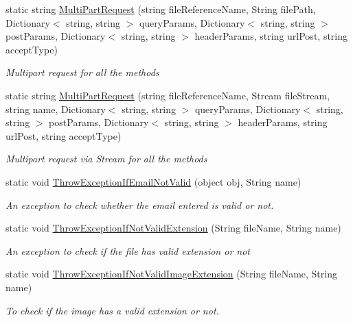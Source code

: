 \begin{DoxyCompactItemize}
\item 
static string \hyperlink{classcom_1_1shephertz_1_1app42_1_1paas_1_1sdk_1_1csharp_1_1util_1_1_util_a32655a413e38208817940c7d5b7113a1}{Multi\+Part\+Request} (string file\+Reference\+Name, String file\+Path, Dictionary$<$ string, string $>$ query\+Params, Dictionary$<$ string, string $>$ post\+Params, Dictionary$<$ string, string $>$ header\+Params, string url\+Post, string accept\+Type)
\begin{DoxyCompactList}\small\item\em Multipart request for all the methods \end{DoxyCompactList}\item 
static string \hyperlink{classcom_1_1shephertz_1_1app42_1_1paas_1_1sdk_1_1csharp_1_1util_1_1_util_aeefeaa92e258f3e4a8e19921c23fb514}{Multi\+Part\+Request} (string file\+Reference\+Name, Stream file\+Stream, string name, Dictionary$<$ string, string $>$ query\+Params, Dictionary$<$ string, string $>$ post\+Params, Dictionary$<$ string, string $>$ header\+Params, string url\+Post, string accept\+Type)
\begin{DoxyCompactList}\small\item\em Multipart request via Stream for all the methods \end{DoxyCompactList}\item 
static void \hyperlink{classcom_1_1shephertz_1_1app42_1_1paas_1_1sdk_1_1csharp_1_1util_1_1_util_ad7cb6f5a951d53e4ecc37b1f09d26321}{Throw\+Exception\+If\+Email\+Not\+Valid} (object obj, String name)
\begin{DoxyCompactList}\small\item\em An exception to check whether the email entered is valid or not. \end{DoxyCompactList}\item 
static void \hyperlink{classcom_1_1shephertz_1_1app42_1_1paas_1_1sdk_1_1csharp_1_1util_1_1_util_a28c41e9017db6a5dd163be3fc3122fd3}{Throw\+Exception\+If\+Not\+Valid\+Extension} (String file\+Name, String name)
\begin{DoxyCompactList}\small\item\em An exception to check if the file has valid extension or not \end{DoxyCompactList}\item 
static void \hyperlink{classcom_1_1shephertz_1_1app42_1_1paas_1_1sdk_1_1csharp_1_1util_1_1_util_a6021b3e8ac131dff48c525ec5c8f278f}{Throw\+Exception\+If\+Not\+Valid\+Image\+Extension} (String file\+Name, String name)
\begin{DoxyCompactList}\small\item\em To check if the image has a valid extension or not. \end{DoxyCompactList}\item 

\end{DoxyCompactItemize}
